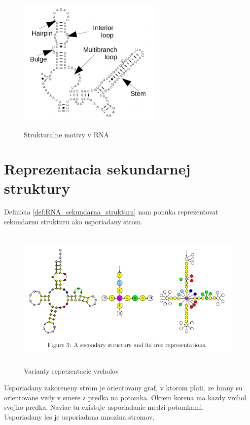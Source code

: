 \begin{figure}[H]
\centering
\includegraphics[width=70mm, height=70mm]{../img/struktury_v_rna.png}
\caption{Strukturalne motivy v RNA}
\label{obr:RNA_motifs}
\end{figure}

\section{Reprezentacia sekundarnej struktury}

Definicia \ref{def:RNA_sekundarna_struktura} nam ponuka reprezentovat sekundarnu strukturu
ako usporiadany strom.

\begin{figure}[H]
\centering
\includegraphics[width=130mm, height=70mm]{../img/stromova_reprezentacia_rna.png}
\caption{Varianty reprezentacie vrcholov}
\label{obr:RNA_vrcholy}
\end{figure}

\begin{definice}\label{def:strom}
  Usporiadany zakoreneny strom je orientovany graf, v ktorom plati, ze hrany su orientovane
  vzdy v smere z predka na potomka. Okrem korena ma kazdy vrchol svojho predka.
  Naviac tu existuje usporiadanie medzi potomkami.
  \\
  Usporiadany les je usporiadana mnozina stromov.
\end{definice}

